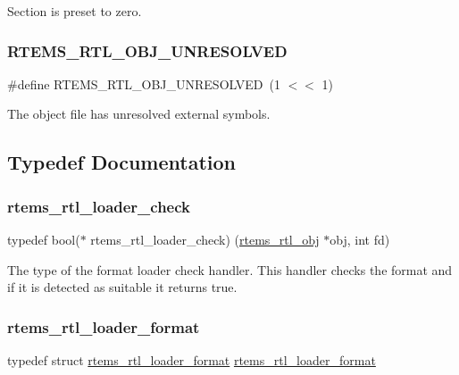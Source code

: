 Section is preset to zero. \mbox{\label{rtl-obj_8h_a61ce363bdf3bd1f62111446f67320517}} 
\subsubsection{\texorpdfstring{RTEMS\_RTL\_OBJ\_UNRESOLVED}{RTEMS\_RTL\_OBJ\_UNRESOLVED}}
{\footnotesize\ttfamily \#define R\+T\+E\+M\+S\+\_\+\+R\+T\+L\+\_\+\+O\+B\+J\+\_\+\+U\+N\+R\+E\+S\+O\+L\+V\+ED~(1 $<$$<$ 1)}

The object file has unresolved external symbols. 

\subsection{Typedef Documentation}
\mbox{\label{rtl-obj_8h_ae65589434f7dfc4ab547022bef414e04}} 
\subsubsection{\texorpdfstring{rtems\_rtl\_loader\_check}{rtems\_rtl\_loader\_check}}
{\footnotesize\ttfamily typedef bool($\ast$ rtems\+\_\+rtl\+\_\+loader\+\_\+check) (\mbox{\hyperlink{structrtems__rtl__obj}{rtems\+\_\+rtl\+\_\+obj}} $\ast$obj, int fd)}

The type of the format loader check handler. This handler checks the format and if it is detected as suitable it returns true. \mbox{\label{rtl-obj_8h_a3742762af1639e494d0867c4344335a9}} 
\subsubsection{\texorpdfstring{rtems\_rtl\_loader\_format}{rtems\_rtl\_loader\_format}}
{\footnotesize\ttfamily typedef struct \mbox{\hyperlink{structrtems__rtl__loader__format}{rtems\+\_\+rtl\+\_\+loader\+\_\+format}}  \mbox{\hyperlink{structrtems__rtl__loader__format}{rtems\+\_\+rtl\+\_\+loader\+\_\+format}}}

